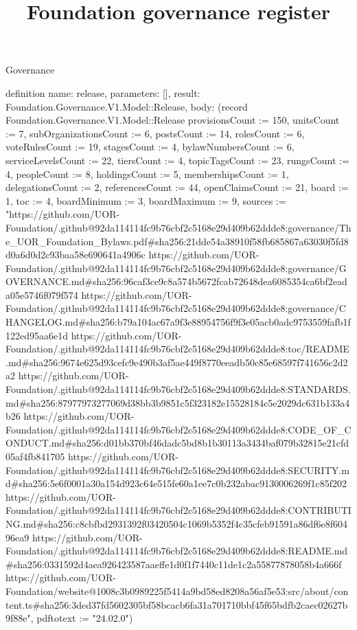 \begin{lexlean}{Governance}
\title{Foundation governance register}
\begin{semanticmodule}
definition{
  name: release,
  parameters: [],
  result: Foundation.Governance.V1.Model::Release,
  body: (record Foundation.Governance.V1.Model::Release {provisionsCount := 150, unitsCount := 7, subOrganizationsCount := 6, postsCount := 14, rolesCount := 6, voteRulesCount := 19, stagesCount := 4, bylawNumbersCount := 6, serviceLevelsCount := 22, tiersCount := 4, topicTagsCount := 23, rungsCount := 4, peopleCount := 8, holdingsCount := 5, membershipsCount := 1, delegationsCount := 2, referencesCount := 44, openClaimsCount := 21, board := 1, toc := 4, boardMinimum := 3, boardMaximum := 9, sources := "https://github.com/UOR-Foundation/.github@92da114114fc9b76cbf2c5168e29d409b62ddde8:governance/The_UOR_Foundation_Bylaws.pdf#sha256:21dde54a38910f58fb685867a63030f5fd8d0a6d0d2c93baa58e690641a4906c https://github.com/UOR-Foundation/.github@92da114114fc9b76cbf2c5168e29d409b62ddde8:governance/GOVERNANCE.md#sha256:96caf3ce9c8a574b5672fcab72648dea6085354ca6bf2eada05e5746f079f574 https://github.com/UOR-Foundation/.github@92da114114fc9b76cbf2c5168e29d409b62ddde8:governance/CHANGELOG.md#sha256:b79a104ac67a9f3e88954756f9f3e05acb0adc9753559fafb1f122ed95aa6e1d https://github.com/UOR-Foundation/.github@92da114114fc9b76cbf2c5168e29d409b62ddde8:toc/README.md#sha256:9674e625d93cefc9e490b3af5ae449f8770eeadb50c85e68597f741656c2d2a2 https://github.com/UOR-Foundation/.github@92da114114fc9b76cbf2c5168e29d409b62ddde8:STANDARDS.md#sha256:87977973277069d38bb3b9851c5f323182e15528184c5e2029dc631b133a4b26 https://github.com/UOR-Foundation/.github@92da114114fc9b76cbf2c5168e29d409b62ddde8:CODE_OF_CONDUCT.md#sha256:d01bb370bf46dadc5bd8b1b30113a3434baf079b32815e21cfd05af4fb841705 https://github.com/UOR-Foundation/.github@92da114114fc9b76cbf2c5168e29d409b62ddde8:SECURITY.md#sha256:5e6f0001a30a154d923c64e515fe60a1ee7c0b232abac9130006269f1c85f202 https://github.com/UOR-Foundation/.github@92da114114fc9b76cbf2c5168e29d409b62ddde8:CONTRIBUTING.md#sha256:c8cbfbd2931392f03420504c1069b5352f4c35cfeb91591a86df6e8f60496ea9 https://github.com/UOR-Foundation/.github@92da114114fc9b76cbf2c5168e29d409b62ddde8:README.md#sha256:0331592d4aea926423587aaeffe1d0f1f7440c11de1c2a55877878058b4a666f https://github.com/UOR-Foundation/website@1008c3b0989225f5414a9bd58ed8208a56af5e53:src/about/content.ts#sha256:3ded37fd5602305bf58bcacb6fa31a701710bbf45f65bdfb2caec02627b9f88e", pdftotext := "24.02.0"})
}


\end{semanticmodule}
\end{lexlean}
